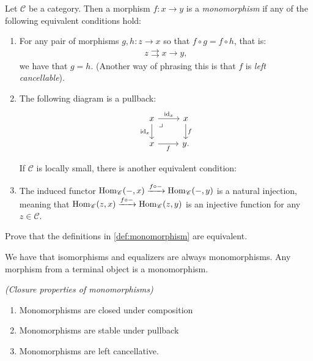 \begin{definition}\label{def:monomorphism} Let $\mathscr{C}$ be a category. Then a morphism $f: x \to y$ is a \textit{monomorphism} if any of the following equivalent conditions hold:
\begin{enumerate}
    \item For any pair of morphisms $g,h : z \to x$ so that $f\circ g = f\circ h$, that is:
    \begin{align*}
        z \rightrightarrows x \to y,
    \end{align*}
    we have that $g = h$. (Another way of phrasing this is that $f$ is \textit{left cancellable}).

    \item The following diagram is a pullback:
\[ \begin{tikzcd}
    x\rar["\id_x" above]\dar["\id_x" left]\pb & x\dar["f" right]\\
    x\rar["f" below] & y.
\end{tikzcd} \]

If $\mathscr{C}$ is locally small, there is another equivalent condition:
\end{enumerate}


\begin{enumerate}
\setcounter{enumi}{2}
    \item The induced functor $\textup{Hom}_\mathscr{C}(-,x) \xrightarrow{f\circ -} \textup{Hom}_\mathscr{C}(-,y)$ is a natural injection, meaning that $\textup{Hom}_\mathscr{C}(z,x) \xrightarrow{f\circ -} \textup{Hom}_\mathscr{C}(z,y)$ is an injective function for any $z\in \mathscr{C}$.
\end{enumerate}
\end{definition}

\begin{exercise} Prove that the definitions in \autoref{def:monomorphism} are equivalent.
\end{exercise}

\begin{example} We have that isomorphisms and equalizers are always monomorphisms. Any morphism from a terminal object is a monomorphism.
\end{example}

\begin{exercise} \textit{(Closure properties of monomorphisms)}
\begin{enumerate}
    \item Monomorphisms are closed under composition
    \item Monomorphisms are stable under pullback
    \item Monomorphisms are left cancellative.
\end{enumerate}
\end{exercise}

